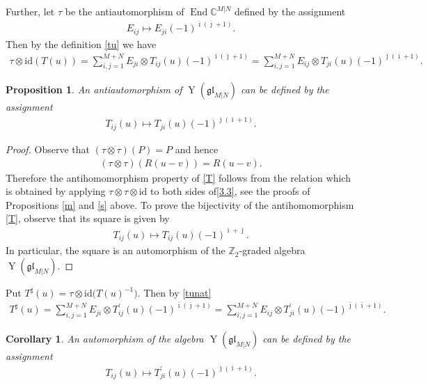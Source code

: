 \documentclass[11pt]{article}
\numberwithin{equation}{section}
\newtheorem{Corollary}[Theorem]{Corollary}
\newtheorem{Proposition}[Theorem]{Proposition}
\def\bi{{\bar\imath }}
\def\bj{{\bar\jmath }}
\def\CC{{\mathbb{C}}}
\def\CMN{\CC^{M|N}}
\def\End{\operatorname{End}}
\def\glMN{\mathfrak{gl}_{M|N}}
\def\id{{\mathrm{id}}}
\def\ot{\otimes}
\def\TP{T^{\prime}}
\def\TS{T^{\sharp}}
\def\YMN{\operatorname{Y}(\glMN)}
\def\ZZ{\mathbb{Z}}
\begin{document}
Further, let $\tau$ be the antiautomorphism of $\End\CMN$
defined by the assignment
\begin{gather*}
E_{ij}\mapsto E_{ji} {(-1)}^{\bi ( \bj + 1)} .
\end{gather*}
Then by the definition \eqref{tu} we have
\begin{gather*}
\tau \ot\id ( T(u) )=
\sum_{i,j=1}^{M+N} E_{ji}\ot T_{ij}(u)
{(-1)}^{\bi ( \bj + 1)}=
\sum_{i,j=1}^{M+N} E_{ij}\ot T_{ji}(u)
{(-1)}^{\bj ( \bi + 1)} .
\end{gather*}

\begin{Proposition}
An antiautomorphism of %
$\YMN$ can be defined by the assignment
\begin{gather}
\label{T}
T_{ij}(u)\mapsto T_{ji}(u)
{(-1)}^{\bj ( \bi + 1)} .
\end{gather}
\end{Proposition}

\begin{proof}
Observe that $(\tau\ot\tau)(P)=P$ and hence
\begin{gather}
\label{Rtt}
(\tau\ot\tau)(R(u-v))=R(u-v) .
\end{gather}
Therefore the antihomomorphism property of \eqref{T}
follows from the relation which is obtained by applying
$\tau\ot\tau\ot\id$ to both sides of\eqref{3.3},
see the proofs of Propositions \ref{m} and \ref{s} above.
To prove the bijectivity of
the antihomomorphism \eqref{T}, observe
that its square is given by %
\begin{gather*}
T_{ij}(u)\mapsto T_{ij}(u)
{(-1)}^{\bi+ \bj} .
\end{gather*}
In particular, the square is an automorphism of the $\ZZ_2$-graded
algebra $\YMN $.
\end{proof}

Put
$\TS(u)=\tau \ot\id \big( T(u)^{-1} \big) $.
Then by \eqref{tunat}
\begin{gather}\label{tsu}
\TS(u)=
\sum_{i,j=1}^{M+N} E_{ji}\ot\TP_{ij}(u)
{(-1)}^{\bi ( \bj + 1)}=
\sum_{i,j=1}^{M+N} E_{ij}\ot\TP_{ji}(u)
{(-1)}^{\bj ( \bi + 1)} .
\end{gather}

\begin{Corollary}
\label{ts}
An automorphism of the algebra $\YMN$ can be defined by the assignment
\begin{gather}
\label{tusharp}
T_{ij}(u)\mapsto\TP_{ji}(u)
{(-1)}^{\bj ( \bi + 1)} .
\end{gather}
\end{Corollary}
\end{document}
